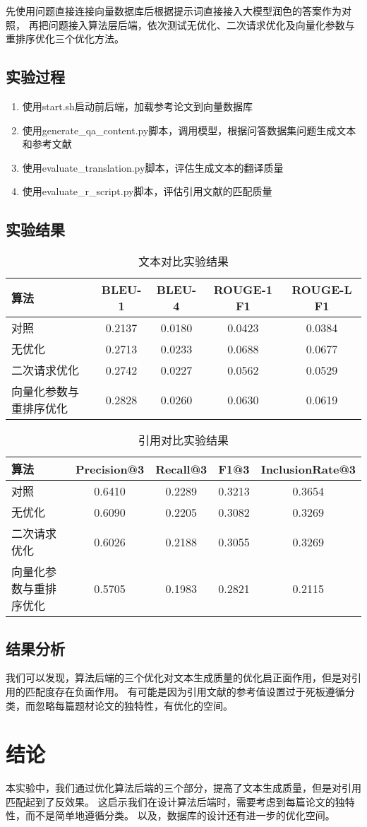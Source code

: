 \documentclass[12pt,a4paper]{article}
\begin{document}
先使用问题直接连接向量数据库后根据提示词直接接入大模型润色的答案作为对照，
再把问题接入算法层后端，依次测试无优化、二次请求优化及向量化参数与重排序优化三个优化方法。

\subsection{实验过程}
\begin{enumerate}
    \item 使用start.sh启动前后端，加载参考论文到向量数据库
    \item 使用generate\_qa\_content.py脚本，调用模型，根据问答数据集问题生成文本和参考文献
    \item 使用evaluate\_translation.py脚本，评估生成文本的翻译质量
    \item 使用evaluate\_r\_script.py脚本，评估引用文献的匹配质量
\end{enumerate}

\subsection{实验结果}

\begin{table}[H]
\centering
\caption{文本对比实验结果}
\begin{tabular}{@{}lcccc@{}}
\toprule
算法 & BLEU-1 & BLEU-4 & ROUGE-1 F1 & ROUGE-L F1 \\
\midrule
对照 & 0.2137 & 0.0180 & 0.0423 & 0.0384 \\
无优化 & 0.2713 & 0.0233 & 0.0688 & 0.0677 \\
二次请求优化 & 0.2742 & 0.0227 & 0.0562 & 0.0529 \\
向量化参数与重排序优化 & 0.2828 & 0.0260 & 0.0630 & 0.0619 \\
\bottomrule
\end{tabular}
\end{table}

\begin{table}[H]
\centering
\caption{引用对比实验结果}
\begin{tabular}{@{}lcccc@{}}
\toprule
算法 & Precision@3 & Recall@3 & F1@3 & InclusionRate@3 \\
\midrule
对照 & 0.6410 & 0.2289 & 0.3213 & 0.3654 \\
无优化 & 0.6090 & 0.2205 & 0.3082 & 0.3269 \\
二次请求优化 & 0.6026 & 0.2188 & 0.3055 & 0.3269 \\
向量化参数与重排序优化 & 0.5705 & 0.1983 & 0.2821 & 0.2115 \\
\bottomrule
\end{tabular}
\end{table}


\subsection{结果分析}
我们可以发现，算法后端的三个优化对文本生成质量的优化启正面作用，但是对引用的匹配度存在负面作用。
有可能是因为引用文献的参考值设置过于死板遵循分类，而忽略每篇题材论文的独特性，有优化的空间。

\section{结论}

本实验中，我们通过优化算法后端的三个部分，提高了文本生成质量，但是对引用匹配起到了反效果。
这启示我们在设计算法后端时，需要考虑到每篇论文的独特性，而不是简单地遵循分类。
以及，数据库的设计还有进一步的优化空间。
\end{document}
